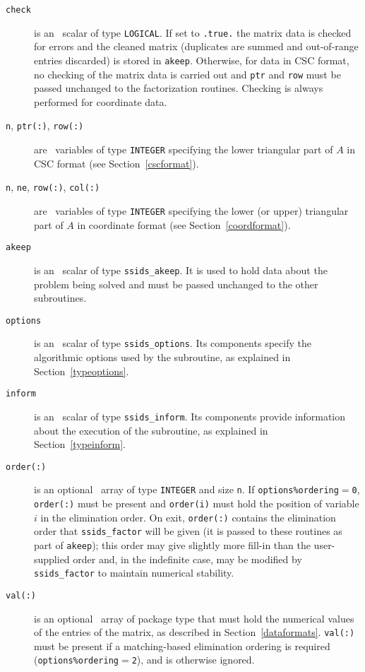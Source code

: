 \documentclass{spral}
\begin{document}
\vspace*{-3mm}
\begin{description}

\item[\texttt{check}] is an \intentin\ scalar of
type  {\tt LOGICAL}. If set to {\tt .true.} the matrix
data is checked for errors and the cleaned matrix
(duplicates are summed and out-of-range entries
discarded) is stored in {\tt akeep}.
Otherwise, for data in CSC format, no checking of the matrix data is carried out
and {\tt ptr} and {\tt row} must be passed unchanged to the factorization routines. Checking is always performed for coordinate data.

\item[\texttt{n}{\rm ,} \texttt{ptr(:)}{\rm ,} \texttt{row(:)}] are \intentin\ 
   variables of type {\tt INTEGER} specifying the lower triangular part of $A$
   in CSC format (see Section~\ref{cscformat}).

\item[\texttt{n}{\rm ,} \texttt{ne}{\rm ,} \texttt{row(:)}{\rm ,} \texttt{col(:)}]
   are \intentin\ variables of type {\tt INTEGER} specifying the lower
   (or upper) triangular part of $A$ in coordinate format (see Section~\ref{coordformat}).

\item[\texttt{akeep}] is an \intentout\ scalar of type
{\tt ssids\_akeep}. It is used to hold data about the problem being
solved and must be passed unchanged to the other subroutines.

\item[\texttt{options}] is an \intentin\ scalar of type {\tt ssids\_options}.
Its components specify the algorithmic options used by the subroutine, as
explained in Section~\ref{typeoptions}.

\item[\texttt{inform}] is an \intentout\ scalar of type
{\tt ssids\_inform}. Its components provide information about the execution
of the subroutine, as explained in Section~\ref{typeinform}.

\item[\texttt{order(:)}] is an optional \intentinout\ array of type
{\tt INTEGER} and size {\tt n}. If {\tt options\%ordering}$=${\tt 0},
{\tt order(:)} must be present and {\tt order(i)} must hold the  position of
variable $i$  in the elimination order. On exit, {\tt order(:)} contains the
elimination order that {\tt ssids\_factor} will be given (it is passed to these
routines as part of {\tt akeep}); this order may give slightly more fill-in
than the user-supplied order and, in the indefinite case, may be modified by
{\tt ssids\_factor} to maintain numerical stability. 

\item[\texttt{val(:)}] is an optional \intentin\ array of package type that must
hold the numerical values of the entries of the matrix, as described in
Section~\ref{dataformats}.
{\tt val(:)} must be present if a matching-based elimination ordering is
required ({\tt options\%ordering$=$2}), and is otherwise ignored.

\end{description}
\end{document}
